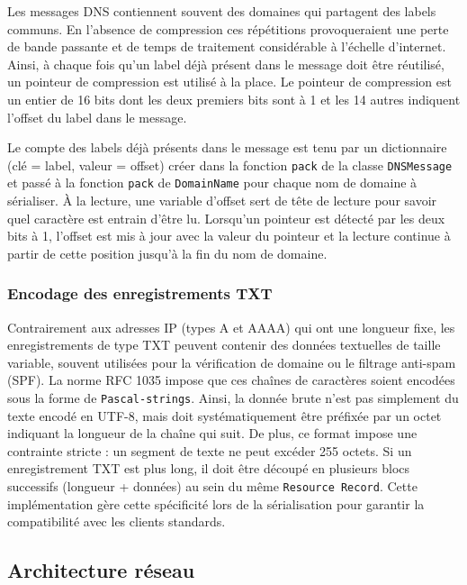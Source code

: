 Les messages DNS contiennent souvent des domaines qui partagent des labels communs.
En l'absence de compression ces répétitions provoqueraient une perte de bande passante et de temps de traitement considérable à l'échelle d'internet.
Ainsi, à chaque fois qu'un label déjà présent dans le message doit être réutilisé, un pointeur de compression est utilisé à la place.
Le pointeur de compression est un entier de 16 bits dont les deux premiers bits sont à 1 et les 14 autres indiquent l'offset du label dans le message.

Le compte des labels déjà présents dans le message est tenu par un dictionnaire (clé = label, valeur = offset) créer dans la fonction \texttt{pack} de la classe \texttt{DNSMessage} et passé à la fonction \texttt{pack} de \texttt{DomainName} pour chaque nom de domaine à sérialiser.
À la lecture, une variable d'offset sert de tête de lecture pour savoir quel caractère est entrain d'être lu.
Lorsqu'un pointeur est détecté par les deux bits à 1, l'offset est mis à jour avec la valeur du pointeur et la lecture continue à partir de cette position jusqu'à la fin du nom de domaine.


\subsubsection{Encodage des enregistrements TXT}
Contrairement aux adresses IP (types A et AAAA) qui ont une longueur fixe, les enregistrements de type TXT peuvent contenir des données textuelles de taille variable, souvent utilisées pour la vérification de domaine ou le filtrage anti-spam (SPF).
La norme RFC 1035 impose que ces chaînes de caractères soient encodées sous la forme de \texttt{Pascal-strings}. Ainsi, la donnée brute n'est pas simplement du texte encodé en UTF-8, mais doit systématiquement être préfixée par un octet indiquant la longueur de la chaîne qui suit.
De plus, ce format impose une contrainte stricte : un segment de texte ne peut excéder 255 octets.
Si un enregistrement TXT est plus long, il doit être découpé en plusieurs blocs successifs (longueur + données) au sein du même \texttt{Resource Record}.
Cette implémentation gère cette spécificité lors de la sérialisation pour garantir la compatibilité avec les clients standards.


\subsection{Architecture réseau}
